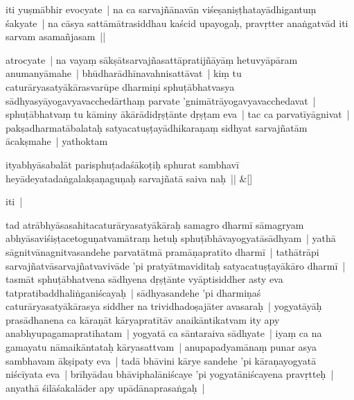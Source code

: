 \documentclass[article,12pt,a4paper]{memoir}%
\newcounter{parCount}
\begin{document}
	  
	  

	  \pstart \leavevmode%
	iti yuṣmābhir evocyate | na ca sarvajñānavān viśeṣaniṣṭhatayādhigantuṃ śakyate | na cāsya sattāmātrasiddhau kaścid upayogaḥ, pravṛtter anaṅgatvād iti sarvam asamañjasam || 
	{}
	\pend%
      

	  \pstart \leavevmode%
	\label{thakur75-4.24}atrocyate | na vayaṃ sākṣātsarvajñasattāpratijñāyāṃ hetuvyāpāram anumanyāmahe | bhūdharādhīnavahnisattāvat | kiṃ tu caturāryasatyākārasvarūpe dharmiṇi sphuṭābhatvasya sādhyasyāyogavyavacchedārthaṃ parvate 'gnimātrāyogavyavacchedavat | sphuṭābhatvaṃ tu kāminy ākārādidṛṣṭānte dṛṣṭam eva | tac ca parvatīyāgnivat | pakṣadharmatābalataḥ satyacatuṣṭayādhikaraṇaṃ sidhyat sarvajñatām ācakṣmahe | yathoktam 
	{}
	\pend%
      
	    
	    \stanza[\smallbreak]
	  ityabhyāsabalāt parisphuṭadaśākoṭiḥ sphurat sambhavī heyādeyatadaṅgalakṣaṇaguṇaḥ sarvajñatā saiva naḥ || \&[\smallbreak]
	  
	  
	  

	  \pstart \leavevmode%
	iti | 
	{}
	\pend%
      

	  \pstart \leavevmode%
	\label{thakur75-4.31}tad atrābhyāsasahitacaturāryasatyākāraḥ samagro dharmī sāmagryam abhyāsaviśiṣṭacetoguṇatvamātraṃ hetuḥ sphuṭībhāvayogyatāsādhyam | yathā sāgnitvānagnitvasandehe parvatātmā pramāṇapratīto dharmī | tathātrāpi sarvajñatvāsarvajñatvavivāde 'pi pratyātmaviditaḥ satyacatuṣṭayākāro dharmī | tasmāt sphuṭābhatvena sādhyena dṛṣṭānte vyāptisiddher asty eva tatpratibaddhaliṅganiścayaḥ | sādhyasandehe 'pi dharmiṇaś caturāryasatyākārasya siddher na trividhadoṣajāter avasaraḥ | yogyatāyāḥ prasādhanena ca kāraṇāt kāryapratītāv anaikāntikatvam ity apy anabhyupagamapratihatam | yogyatā ca sāntaraiva sādhyate | iyaṃ ca na gamayatu nāmaikāntataḥ kāryasattvam | anupapadyamānaṃ punar asya sambhavam ākṣipaty eva | tadā bhāvini kārye sandehe 'pi kāraṇayogyatā niścīyata eva | brīhyādau bhāviphalāniścaye 'pi yogyatāniścayena pravṛtteḥ | anyathā śilāśakalāder apy upādānaprasaṅgaḥ | 
	{}
	\pend%
      
\end{document}
